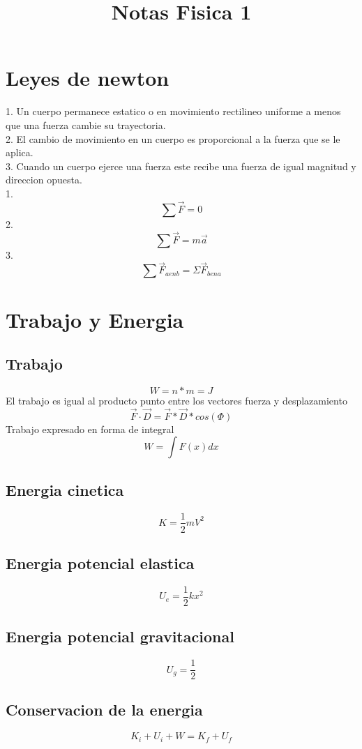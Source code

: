 \documentclass[12pt]{article}
\title{Notas Fisica 1}
\begin{document}
\maketitle
\section*{Leyes de newton}
1. Un cuerpo permanece estatico o en movimiento rectilineo uniforme a menos que una fuerza cambie su trayectoria.\\
2. El cambio de movimiento en un cuerpo es proporcional a la fuerza que se le aplica.\\
3. Cuando un cuerpo ejerce una fuerza este recibe una fuerza de igual magnitud y direccion opuesta.\\
1.
\begin{equation}
 \sum\vec{F}=0
\end{equation}
2.
\begin{equation}
 \sum\vec{F}=m\vec{a}
\end{equation}
3.
\begin{equation}
 \sum\vec{F}_{a en b}=Σ\vec{F}_{b en a} 
\end{equation}
\section*{Trabajo y Energia}
\subsection*{Trabajo}
\begin{equation}
 W=n*m=J
\end{equation}
El trabajo es igual al producto punto entre los vectores fuerza y desplazamiento
\begin{equation}
 \vec{F}\cdot{\vec{D}}=\vec{F}*\vec{D}*cos(Φ)
\end{equation}
Trabajo expresado en forma de integral
\begin{equation}
 W=\int F(x)dx
\end{equation}
\subsection*{Energia cinetica}
\begin{equation}
 K=\frac{1}{2}mV^{2}
\end{equation}
\subsection*{Energia potencial elastica}
\begin{equation}
 U_{e}=\frac{1}{2}kx^{2}
\end{equation}
\subsection*{Energia potencial gravitacional}
\begin{equation}
 U_{g}=\frac{1}{2}
\end{equation}
\subsection*{Conservacion de la energia}
\begin{equation}
 K_{i}+U_{i}+W=K_{f}+U_{f}
\end{equation}
\end{document}
